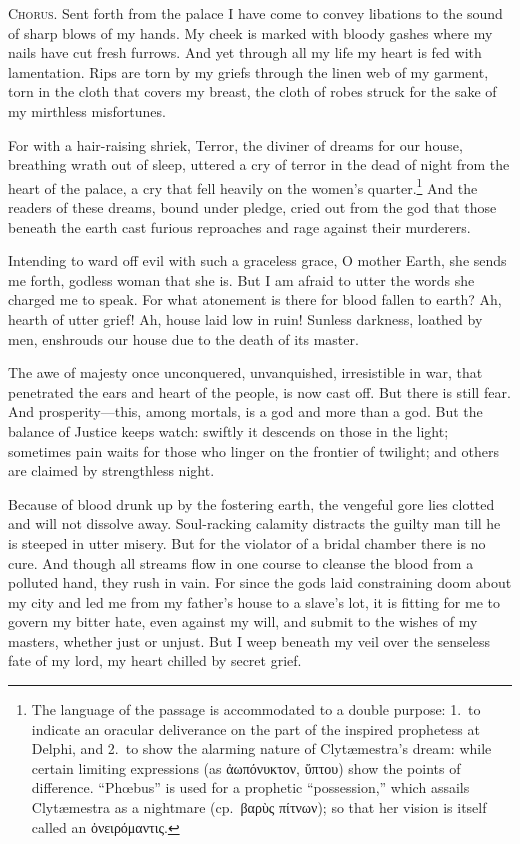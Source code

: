\documentclass[12pt]{article}
\begin{document}
\textsc{Chorus.} Sent forth from the palace I have come to convey libations to the sound of sharp blows of my hands. My cheek is marked with bloody gashes where my nails have cut fresh furrows. And yet through all my life my heart is fed with lamentation. Rips are torn by my griefs through the linen web of my garment, torn in the cloth that covers my breast, the cloth of robes struck for the sake of my mirthless misfortunes.

For with a hair-raising shriek, Terror, the diviner of dreams for our house, breathing wrath out of sleep, uttered a cry of terror in the dead of night from the heart of the palace, a cry that fell heavily on the women's quarter.\footnote{The language of the passage is accommodated to a double purpose: 1.~to indicate an oracular deliverance on the part of the inspired prophetess at Delphi, and 2.~to show the alarming nature of Clyt{\ae}mestra's dream: while certain limiting expressions (as ἀωπόνυκτον, ὕπτου) show the points of difference. ``Ph{\oe}bus'' is used for a prophetic ``possession,'' which assails Clyt{\ae}mestra as a nightmare (cp.~βαρὺς πίτνων); so that her vision is itself called an ὀνειρόμαντις.} And the readers of these dreams, bound under pledge, cried out from the god that those beneath the earth cast furious reproaches and rage against their murderers.

Intending to ward off evil with such a graceless grace, O mother Earth, she sends me forth, godless woman that she is. But I am afraid to utter the words she charged me to speak. For what atonement is there for blood fallen to earth? Ah, hearth of utter grief! Ah, house laid low in ruin! Sunless darkness, loathed by men, enshrouds our house due to the death of its master.

The awe of majesty once unconquered, unvanquished, irresistible in war, that penetrated the ears and heart of the people, is now cast off. But there is still fear. And prosperity---this, among mortals, is a god and more than a god. But the balance of Justice keeps watch: swiftly it descends on those in the light; sometimes pain waits for those who linger on the frontier of twilight; and others are claimed by strengthless night.

Because of blood drunk up by the fostering earth, the vengeful gore lies clotted and will not dissolve away. Soul-racking calamity distracts the guilty man till he is steeped in utter misery. But for the violator of a bridal chamber there is no cure. And though all streams flow in one course to cleanse the blood from a polluted hand, they rush in vain. For since the gods laid constraining doom about my city and led me from my father's house to a slave's lot, it is fitting for me to govern my bitter hate, even against my will, and submit to the wishes of my masters, whether just or unjust. But I weep beneath my veil over the senseless fate of my lord, my heart chilled by secret grief.
\end{document}

